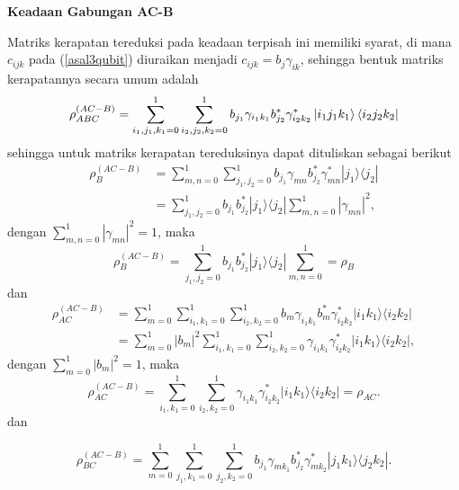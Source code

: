\textbf{Keadaan Gabungan AC-B}

Matriks kerapatan tereduksi pada keadaan terpisah ini memiliki syarat, di mana $c_{ijk}$ pada (\ref{asal3qubit}) diuraikan menjadi $c_{ijk}=b_j\gamma_{ik}$, sehingga bentuk matriks kerapatannya secara umum adalah
\begin{equation}
	\rho_{ABC}^{(AC-B)}=\sum_{i_1,j_1,k_1=0}^1\sum_{i_2,j_2,k_2=0}^1 b_{j_1}\gamma_{i_1k_1}b^{*}_{j_2}\gamma^{*}_{i_2k_2}\ket{i_1j_1k_1}\bra{i_2j_2k_2}
\end{equation}
sehingga untuk matriks kerapatan tereduksinya dapat dituliskan sebagai berikut
\begin{align*}
	\rho_{B}^{(AC-B)}
	&=\sum_{m,n=0}^{1}\sum_{j_1,j_2=0}^{1} b_{j_1}\gamma_{mn}b^{*}_{j_2}\gamma^{*}_{mn}|j_1\rangle \langle j_2| \\
	&=\sum_{j_1,j_2=0}^{1} b_{j_1}b^{*}_{j_2}|j_1\rangle \langle j_2| \sum_{m,n=0}^{1}|\gamma_{mn}|^2,
\end{align*}
dengan $\sum_{m,n=0}^{1}|\gamma_{mn}|^2=1$, maka
\begin{equation}
	\rho_{B}^{(AC-B)}=\sum_{j_1,j_2=0}^{1} b_{j_1}b^{*}_{j_2}|j_1\rangle \langle j_2| \sum_{m,n=0}^{1}=\rho_{B}
\end{equation}
dan
\begin{align*}
	\rho_{AC}^{(AC-B)}
	&= \sum_{m=0}^{1} \sum_{i_1,k_1=0}^{1}\sum_{i_2,k_2=0}^{1} b_m \gamma_{i_1 k_1}b^{*}_m\gamma^{*}_{i_2 k_2}|i_1 k_1\rangle \langle i_2 k_2| \\
	&= \sum_{m=0}^{1} |b_{m}|^2 \sum_{i_1,k_1=0}^{1}\sum_{i_2,k_2=0}^{1} \gamma_{i_1 k_1} \gamma^{*}_{i_2 k_2}|i_1 k_1\rangle \langle i_2 k_2|,
\end{align*}
dengan $\sum_{m=0}^{1} |b_{m}|^2=1$, maka
\begin{equation}
	\rho_{AC}^{(AC-B)}=\sum_{i_1,k_1=0}^{1}\sum_{i_2,k_2=0}^{1} \gamma_{i_1 k_1} \gamma^{*}_{i_2 k_2}|i_1 k_1\rangle \langle i_2 k_2|=\rho_{AC}.
\end{equation}
dan

\begin{equation}
	\rho_{BC}^{(AC-B)} = \sum_{m=0}^{1} \sum_{j_1,k_1=0}^{1}\sum_{j_2,k_2=0}^{1} b_{j_1}\gamma_{m k_1}b^{*}_{j_2}\gamma^{*}_{m k_2}|j_1 k_1\rangle \langle j_2 k_2|.
\end{equation}

